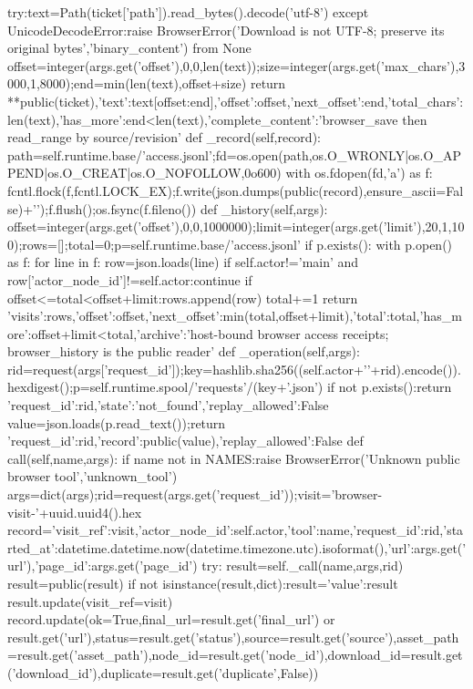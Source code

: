   try:text=Path(ticket['path']).read_bytes().decode('utf-8')
  except UnicodeDecodeError:raise BrowserError('Download is not UTF-8; preserve its original bytes','binary_content') from None
  offset=integer(args.get('offset'),0,0,len(text));size=integer(args.get('max_chars'),3000,1,8000);end=min(len(text),offset+size)
  return {**public(ticket),'text':text[offset:end],'offset':offset,'next_offset':end,'total_chars':len(text),'has_more':end<len(text),'complete_content':'browser_save then read_range by source/revision'}
 def _record(self,record):
  path=self.runtime.base/'access.jsonl';fd=os.open(path,os.O_WRONLY|os.O_APPEND|os.O_CREAT|os.O_NOFOLLOW,0o600)
  with os.fdopen(fd,'a') as f:
   fcntl.flock(f,fcntl.LOCK_EX);f.write(json.dumps(public(record),ensure_ascii=False)+'\n');f.flush();os.fsync(f.fileno())
 def _history(self,args):
  offset=integer(args.get('offset'),0,0,1000000);limit=integer(args.get('limit'),20,1,100);rows=[];total=0;p=self.runtime.base/'access.jsonl'
  if p.exists():
   with p.open() as f:
    for line in f:
     row=json.loads(line)
     if self.actor!='main' and row['actor_node_id']!=self.actor:continue
     if offset<=total<offset+limit:rows.append(row)
     total+=1
  return {'visits':rows,'offset':offset,'next_offset':min(total,offset+limit),'total':total,'has_more':offset+limit<total,'archive':'host-bound browser access receipts; browser_history is the public reader'}
 def _operation(self,args):
  rid=request(args['request_id']);key=hashlib.sha256((self.actor+'\0'+rid).encode()).hexdigest();p=self.runtime.spool/'requests'/(key+'.json')
  if not p.exists():return {'request_id':rid,'state':'not_found','replay_allowed':False}
  value=json.loads(p.read_text());return {'request_id':rid,'record':public(value),'replay_allowed':False}
 def call(self,name,args):
  if name not in NAMES:raise BrowserError('Unknown public browser tool','unknown_tool')
  args=dict(args);rid=request(args.get('request_id'));visit='browser-visit-'+uuid.uuid4().hex
  record={'visit_ref':visit,'actor_node_id':self.actor,'tool':name,'request_id':rid,'started_at':datetime.datetime.now(datetime.timezone.utc).isoformat(),'url':args.get('url'),'page_id':args.get('page_id')}
  try:
   result=self._call(name,args,rid)
   result=public(result)
   if not isinstance(result,dict):result={'value':result}
   result.update(visit_ref=visit)
   record.update(ok=True,final_url=result.get('final_url') or result.get('url'),status=result.get('status'),source=result.get('source'),asset_path=result.get('asset_path'),node_id=result.get('node_id'),download_id=result.get('download_id'),duplicate=result.get('duplicate',False))
